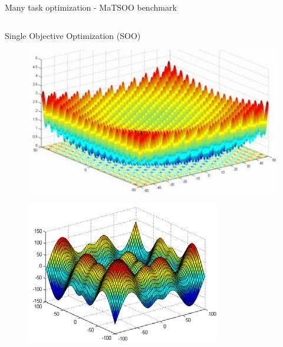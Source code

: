 \begin{frame}{Many task optimization - MaTSOO benchmark}
\begin{columns}
\begin{column}{0.48\textwidth}
\begin{block}{Single Objective Optimization (SOO)}
\begin{figure}
                \end{figure}
                \begin{figure}
                    \includegraphics[width=0.4\linewidth]{figure/intro/griewank.jpeg}
                \end{figure}
                \begin{figure}
                    \includegraphics[width=0.4\linewidth]{figure/intro/schwefel.png}
                \end{figure}
            \end{block}
        \end{column}
    \end{columns}
\end{frame}
